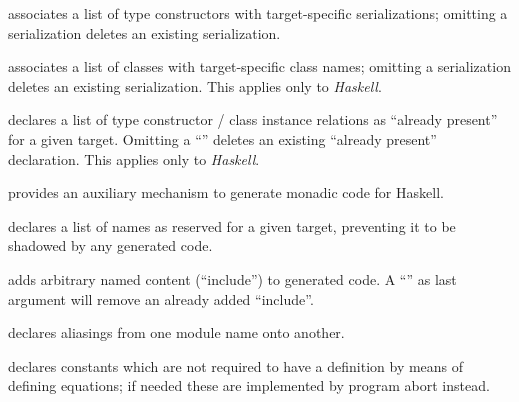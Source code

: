 \begin{isabellebody}
\begin{isamarkuptext}
\begin{description}
  \item \hyperlink{command.HOL.code-type}{\mbox{}} associates a list of type
  constructors with target-specific serializations; omitting a
  serialization deletes an existing serialization.

  \item \hyperlink{command.HOL.code-class}{\mbox{}} associates a list of classes
  with target-specific class names; omitting a serialization deletes
  an existing serialization.  This applies only to \emph{Haskell}.

  \item \hyperlink{command.HOL.code-instance}{\mbox{}} declares a list of type
  constructor / class instance relations as ``already present'' for a
  given target.  Omitting a ``\isa{{\isachardoublequote}{\isacharminus}{\isachardoublequote}}'' deletes an existing
  ``already present'' declaration.  This applies only to
  \emph{Haskell}.

  \item \hyperlink{command.HOL.code-monad}{\mbox{}} provides an auxiliary mechanism
  to generate monadic code for Haskell.

  \item \hyperlink{command.HOL.code-reserved}{\mbox{}} declares a list of names as
  reserved for a given target, preventing it to be shadowed by any
  generated code.

  \item \hyperlink{command.HOL.code-include}{\mbox{}} adds arbitrary named content
  (``include'') to generated code.  A ``\isa{{\isachardoublequote}{\isacharminus}{\isachardoublequote}}'' as last argument
  will remove an already added ``include''.

  \item \hyperlink{command.HOL.code-modulename}{\mbox{}} declares aliasings from one
  module name onto another.

  \item \hyperlink{command.HOL.code-abort}{\mbox{}} declares constants which are not
  required to have a definition by means of defining equations; if
  needed these are implemented by program abort instead.


\end{description}
\end{isamarkuptext}
\end{isabellebody}
